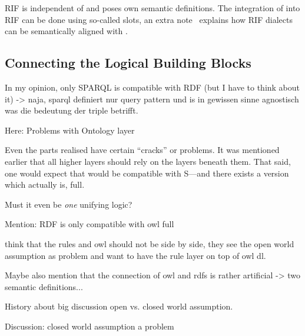 RIF is independent of \rdf and poses own semantic definitions. The integration of \rdf into RIF can be done using so-called slots, an extra note~\cite{rifrdf} 
explains how RIF dialects 
can be semantically aligned with \rdf. 
%





\subsection{Connecting the Logical Building Blocks}
In my opinion, only SPARQL is compatible with RDF (but I have to think about it) -> naja, sparql definiert nur query pattern und is in gewissen sinne agnostisch was die bedeutung der triple betrifft.

Here: Problems with Ontology layer

Even the parts realised have certain ``cracks'' or problems. It was mentioned earlier that all higher layers should rely
on the layers beneath them. That said, one would expect that \owl would be compatible with \rdf{}S---and there exists a version which actually is, \owl full. 

Must it even be \emph{one} unifying logic?


Mention: RDF is only compatible with owl full

\cite{twotowers} think that the rules and owl should not be side by side, they see the open world assumption as problem and want to have the rule layer on top of owl dl.

Maybe also mention that the connection of owl and rdfs is rather artificial -> two semantic definitions...


History about big discussion open vs. closed world assumption.

Discussion: closed world assumption a problem

